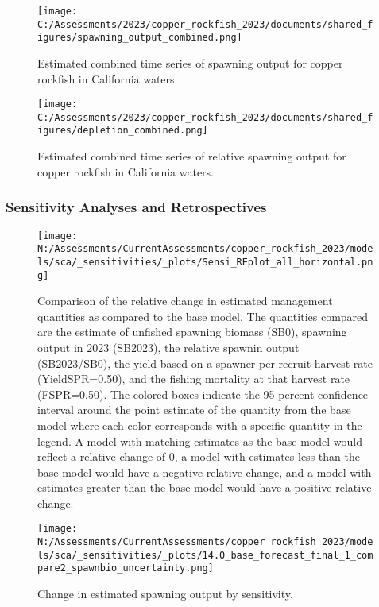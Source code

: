 \documentclass[11pt,
  english,
  letterpaper,
]{article}
\begin{document}
\begin{figure}
\centering
\texttt{[image: C:/Assessments/2023/copper\_rockfish\_2023/documents/shared\_figures/spawning\_output\_combined.png]}
\caption{Estimated combined time series of spawning output for copper rockfish in California waters.\label{fig:sb-all}}
\end{figure}

\clearpage

\begin{figure}
\centering
\texttt{[image: C:/Assessments/2023/copper\_rockfish\_2023/documents/shared\_figures/depletion\_combined.png]}
\caption{Estimated combined time series of relative spawning output for copper rockfish in California waters.\label{fig:depl-all}}
\end{figure}

\clearpage

\hypertarget{sensitivity-analyses-and-retrospectives}{%
\subsubsection{Sensitivity Analyses and Retrospectives}\label{sensitivity-analyses-and-retrospectives}}

\begin{figure}
\centering
\texttt{[image: N:/Assessments/CurrentAssessments/copper\_rockfish\_2023/models/sca/\_sensitivities/\_plots/Sensi\_REplot\_all\_horizontal.png]}
\caption{Comparison of the relative change in estimated management quantities as compared to the base model. The quantities compared are the estimate of unfished spawning biomass (SB0), spawning output in 2023 (SB2023), the relative spawnin output (SB2023/SB0), the yield based on a spawner per recruit harvest rate (YieldSPR=0.50), and the fishing mortality at that harvest rate (FSPR=0.50). The colored boxes indicate the 95 percent confidence interval around the point estimate of the quantity from the base model where each color corresponds with a specific quantity in the legend. A model with matching estimates as the base model would reflect a relative change of 0, a model with estimates less than the base model would have a negative relative change, and a model with estimates greater than the base model would have a positive relative change.\label{fig:sens-all}}
\end{figure}

\newpage

\begin{figure}
\centering
\texttt{[image: N:/Assessments/CurrentAssessments/copper\_rockfish\_2023/models/sca/\_sensitivities/\_plots/14.0\_base\_forecast\_final\_1\_compare2\_spawnbio\_uncertainty.png]}
\caption{Change in estimated spawning output by sensitivity.\label{fig:sens-ssb-1}}
\end{figure}
\end{document}
